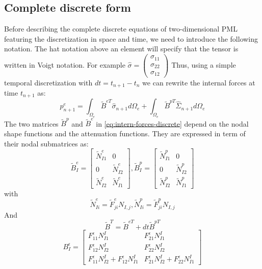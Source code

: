 \subsection{Complete discrete form}
Before describing the complete discrete equations of two-dimensional PML featuring the discretization in space and time, we need to introduce the following notation. The hat notation above an element will specify that the tensor is written in Voigt notation. For example $\hat{\sigma} = \begin{pmatrix}
\sigma_{11} \\
\sigma_{22} \\
\sigma_{12}
\end{pmatrix}$ 
Thus, using a simple temporal discretization with $dt=t_{n+1} - t_n$ we can rewrite the internal forces at time $t_{n+1}$ as:
\begin{equation}
p_{n+1}^e = \int_{\Omega_e} \tilde{B}^{eT} \hat{\sigma}_{n+1} d\Omega_e + \int_{\Omega_e}\tilde{B}^{pT} \hat{\Sigma}_{n+1} d\Omega_e
\label{eq:intern-forces-discrete}
\end{equation} 
The two matrices $\tilde{B}^{p}$ and $\tilde{B}^{e}$ in \ref{eq:intern-forces-discrete} depend on the nodal shape functions and the attenuation functions. They are expressed in term of their nodal submatrices as:
\begin{equation}
\tilde{B}^e_I = \begin{bmatrix}
\tilde{N}^e_{I1}&0\\0&\tilde{N}^e_{I2}\\\tilde{N}^e_{I2}&\tilde{N}^e_{I1}
\end{bmatrix}, \tilde{B}^p_I = \begin{bmatrix}
\tilde{N}^p_{I1}&0\\0&\tilde{N}^p_{I2}\\\tilde{N}^p_{I2}&\tilde{N}^p_{I1}
\end{bmatrix}
\end{equation} 
with 
\begin{equation}
\tilde{N}^e_{Ii} = \tilde{F}^e_{ji}N_{I,j}, \tilde{N}^p_{Ii} = \tilde{F}^p_{ji}N_{I,j}
\end{equation}
And
\begin{equation}
\tilde{B}^T = \tilde{B}^{eT}+dt \tilde{B}^{pT}
\end{equation}
\begin{equation}
B^\epsilon_I = \begin{bmatrix}
F^\epsilon_{11}N^I_{I1}&F^\epsilon_{21}N^I_{I1}\\
F^\epsilon_{12}N^I_{I2}&F^\epsilon_{22}N^I_{I2}\\
F^\epsilon_{11}N^I_{I2}+F^\epsilon_{12}N^I_{I1}& F^\epsilon_{21}N^I_{I2}+F^\epsilon_{22}N^I_{I1}
\end{bmatrix}
\end{equation}

